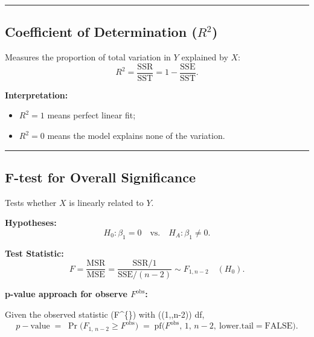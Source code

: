 \documentclass[
  letterpaper,
  DIV=11,
  numbers=noendperiod]{scrreprt}
\providecommand{\tightlist}{%
  \setlength{\itemsep}{0pt}\setlength{\parskip}{0pt}}\usepackage{longtable,booktabs,array}
\begin{document}
\begin{center}\rule{0.5\linewidth}{0.5pt}\end{center}

\subsection{\texorpdfstring{Coefficient of Determination
(\(R^2\))}{Coefficient of Determination (R\^{}2)}}\label{coefficient-of-determination-r2}

Measures the proportion of total variation in \(Y\) explained by \(X\):
\[
R^2 = \frac{\mathrm{SSR}}{\mathrm{SST}}
= 1 - \frac{\mathrm{SSE}}{\mathrm{SST}}.
\]

\textbf{Interpretation:}

\begin{itemize}
\tightlist
\item
  \(R^2 = 1\) means perfect linear fit;
\item
  \(R^2 = 0\) means the model explains none of the variation.
\end{itemize}

\begin{center}\rule{0.5\linewidth}{0.5pt}\end{center}

\subsection{F-test for Overall
Significance}\label{f-test-for-overall-significance}

Tests whether \(X\) is linearly related to \(Y\).

\textbf{Hypotheses:} \[
H_0: \beta_1 = 0
\quad \text{vs.} \quad
H_A: \beta_1 \ne 0.
\]

\textbf{Test Statistic:} \[
F = \frac{\text{MSR}}{\text{MSE}}
= \frac{\text{SSR}/1}{\text{SSE}/(n-2)}
\sim F_{1,n-2}\quad (H_0).
\]

\textbf{p-value approach for observe \(F^{\mathrm{obs}}\):}

Given the observed statistic (F\^{}\{\}) with ((1,,n-2)) df,
\[
p-\text{value} \;=\; \Pr\!\big(F_{1,\,n-2} \ge F^{\text{obs}}\big)
\;=\; \mathrm{pf}\!\big(F^{\text{obs}},\,1,\,n-2,\ \text{lower.tail}= \mathrm{FALSE}\big).
\]
\end{document}
